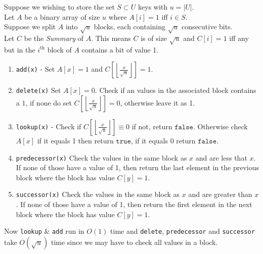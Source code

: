 \documentclass[11pt,a4paper]{article}
\begin{document}
Suppose we wishing to store the set $S\subset U$ keys with $u=|U|$.\\
Let $A$ be a binary array of size $u$ where $A[i]=1$ iff $i\in S$.\\
Suppose we split $A$ into $\sqrt{u}$ blocks, each containing $\sqrt{u}$ consecutive bits.\\
Let $C$ be the \textit{Summary} of $A$. This means $C$ is of size $\sqrt{u}$ and $C[i]=1$ iff any but in the $i^\text{th}$ block of $A$ contains a bit of value 1.
\begin{enumerate}
	\item \lstinline!add(x)! - Set $A[x]=1$ and $C\left[\left\lfloor\frac{x}{\sqrt{u}}\right\rfloor\right]=1$.
	\item \lstinline!delete(x)! Set $A[x]=0$. Check if an values in the associated block contains a $1$, if none do set $C\left[\left\lfloor\frac{x}{\sqrt{u}}\right\rfloor\right]=0$, otherwise leave it as 1.
	\item \lstinline!lookup(x)! - Check if $C\left[\left\lfloor\frac{x}{\sqrt{u}}\right\rfloor\right]\equiv0$ if not, return $\mathtt{false}$. Otherwise check $A[x]$ if it equals 1 then return $\mathtt{true}$, if it equals 0 return $\mathtt{false}$.
	\item \lstinline!predecessor(x)! Check the values in the same block as $x$ and are less that $x$. If none of those have a value of 1, then return the last element in the previous block where the block has value $C[y]=1$.
	\item \lstinline!successor(x)! Check the values in the same block as $x$ and are greater than $x$. If none of those have a value of 1, then return the first element in the next block where the block has value $C[y]=1$.
\end{enumerate}
Now \lstinline!lookup! \& \lstinline!add! run in $O(1)$ time and \lstinline!delete!, \lstinline!predecessor! and \lstinline!successor! take $O(\sqrt{u})$ time since we may have to check all values in a block.\\
\end{document}
